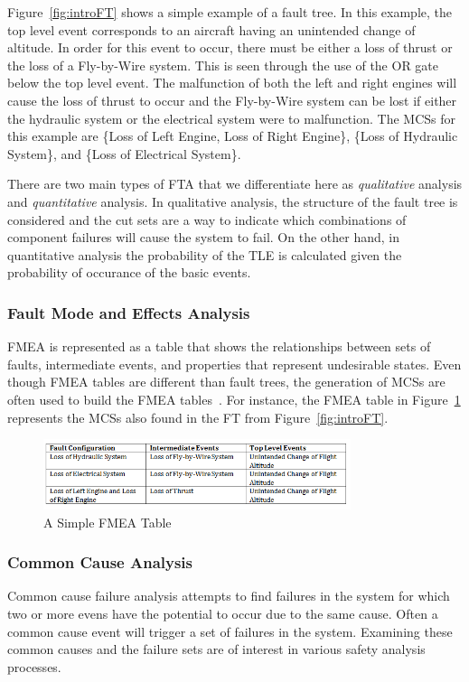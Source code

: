 Figure~\ref{fig:introFT} shows a simple example of a fault tree. In this example, the top level event corresponds to an aircraft having an unintended change of altitude. In order for this event to occur, there must be either a loss of thrust or the loss of a Fly-by-Wire system. This is seen through the use of the OR gate below the top level event. The malfunction of both the left and right engines will cause the loss of thrust to occur and the Fly-by-Wire system can be lost if either the hydraulic system or the electrical system were to malfunction. The MCSs for this example are \{Loss of Left Engine, Loss of Right Engine\}, \{Loss of Hydraulic System\}, and \{Loss of Electrical System\}. 

There are two main types of FTA that we differentiate here as \textit{qualitative} analysis and \textit{quantitative} analysis. In qualitative analysis, the structure of the fault tree is considered and the cut sets are a way to indicate which combinations of component failures will cause the system to fail. On the other hand, in quantitative analysis the probability of the TLE is calculated given the probability of occurance of the basic events. 


\subsubsection{Fault Mode and Effects Analysis}
FMEA is represented as a table that shows the relationships between sets of faults, intermediate events, and properties that represent undesirable states. Even though FMEA tables are different than fault trees, the generation of MCSs are often used to build the FMEA tables~\cite{Bozzano:2010:DSA:1951720}. For instance, the FMEA table in Figure~\ref{fig:introFMEA} represents the MCSs also found in the FT from Figure~\ref{fig:introFT}.

\begin{figure}[h]
\begin{center}
\includegraphics[width=9cm]{images/fmea.png}
\caption{A Simple FMEA Table} \label{fig:introFMEA}
\end{center}
\end{figure}

\subsubsection{Common Cause Analysis}
Common cause failure analysis attempts to find failures in the system for which two or more evens have the potential to occur due to the same cause. Often a common cause event will trigger a set of failures in the system. Examining these common causes and the failure sets are of interest in various safety analysis processes.


